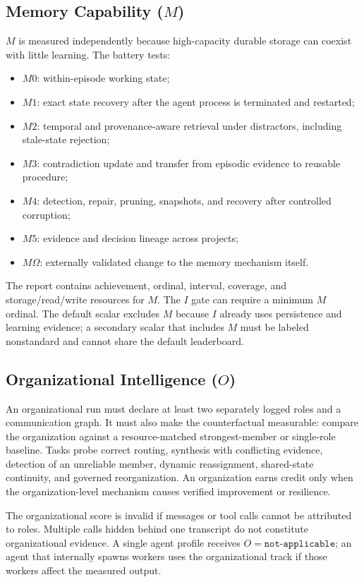 \documentclass[11pt]{article}
\theoremstyle{definition}
\newcommand{\Om}{\ensuremath{\Omega}}
\begin{document}
\subsection{Memory Capability ($M$)}

$M$ is measured independently because high-capacity durable storage can coexist with little learning. The battery tests:

\begin{itemize}
\item $M0$: within-episode working state;
\item $M1$: exact state recovery after the agent process is terminated and restarted;
\item $M2$: temporal and provenance-aware retrieval under distractors, including stale-state rejection;
\item $M3$: contradiction update and transfer from episodic evidence to reusable procedure;
\item $M4$: detection, repair, pruning, snapshots, and recovery after controlled corruption;
\item $M5$: evidence and decision lineage across projects;
\item $M\Om{}$: externally validated change to the memory mechanism itself.
\end{itemize}

The report contains achievement, ordinal, interval, coverage, and storage/read/write resources for $M$. The $I$ gate can require a minimum $M$ ordinal. The default scalar excludes $M$ because $I$ already uses persistence and learning evidence; a secondary scalar that includes $M$ must be labeled nonstandard and cannot share the default leaderboard.

\subsection{Organizational Intelligence ($O$)}

An organizational run must declare at least two separately logged roles and a communication graph. It must also make the counterfactual measurable: compare the organization against a resource-matched strongest-member or single-role baseline. Tasks probe correct routing, synthesis with conflicting evidence, detection of an unreliable member, dynamic reassignment, shared-state continuity, and governed reorganization. An organization earns credit only when the organization-level mechanism causes verified improvement or resilience.

The organizational score is invalid if messages or tool calls cannot be attributed to roles. Multiple calls hidden behind one transcript do not constitute organizational evidence. A single agent profile receives $O=\texttt{not-applicable}$; an agent that internally spawns workers uses the organizational track if those workers affect the measured output.
\end{document}
